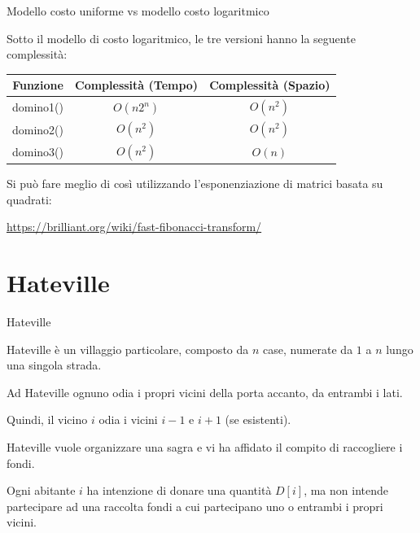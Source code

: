 \begin{frame}{Modello costo uniforme vs modello costo logaritmico}
  
Sotto il modello di costo logaritmico, le tre versioni hanno la seguente
complessità:

\begin{center}
\begin{tabular}{|c|c|c|}
\hline
\textbf{Funzione} & \textbf{Complessità (Tempo)} & \textbf{Complessità (Spazio)} \\\hline
\textsf{domino1()} & $O(n2^n)$ & $O(n^2)$ \\\hline
\textsf{domino2()} & $O(n^2)$ & $O(n^2)$ \\\hline
\textsf{domino3()} & $O(n^2)$ & $O(n)$ \\\hline
\end{tabular}
\end{center}

\bigskip
Si può fare meglio di così utilizzando l'esponenziazione di matrici basata
su quadrati:

\bigskip
\url{https://brilliant.org/wiki/fast-fibonacci-transform/}


\end{frame}

\section{Hateville}

\begin{frame}{Hateville}

\BIL
\item Hateville è un villaggio particolare, composto da $n$ case, numerate da $1$ a 
$n$ lungo una singola strada. 

\item Ad Hateville ognuno odia i propri vicini della 
porta accanto, da entrambi i lati.
\item Quindi, il vicino $i$ odia i vicini $i-1$ e $i+1$ (se esistenti). 

\item Hateville vuole organizzare una sagra e vi 
ha affidato il compito di raccogliere i fondi. 

\item Ogni abitante $i$ ha intenzione
di  donare una quantità $D[i]$, ma non intende partecipare ad una raccolta 
fondi a cui partecipano uno o entrambi i propri vicini. 

\EIL

\end{frame}

